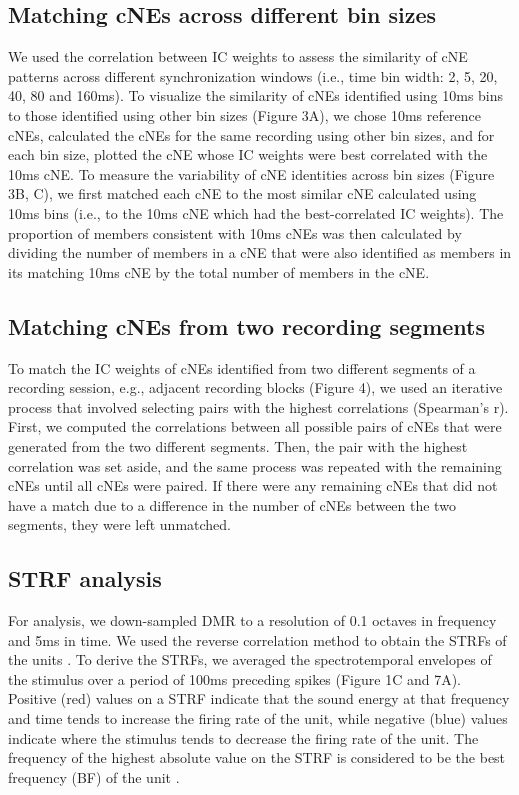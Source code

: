 \documentclass[11pt]{article}
\begin{document}
\subsection*{Matching cNEs across different bin sizes}
We used the correlation between IC weights to assess the similarity of cNE patterns across different synchronization windows (i.e., time bin width: 2, 5, 20, 40, 80 and 160ms). To visualize the similarity of cNEs identified using 10ms bins to those identified using other bin sizes (Figure 3A), we chose 10ms reference cNEs, calculated the cNEs for the same recording using other bin sizes, and for each bin size, plotted the cNE whose IC weights were best correlated with the 10ms cNE. To measure the variability of cNE identities across bin sizes (Figure 3B, C), we first matched each cNE to the most similar cNE calculated using 10ms bins (i.e., to the 10ms cNE which had the best-correlated IC weights). The proportion of members consistent with 10ms cNEs was then calculated by dividing the number of members in a cNE that were also identified as members in its matching 10ms cNE by the total number of members in the cNE.

\subsection*{Matching cNEs from two recording segments}
To match the IC weights of cNEs identified from two different segments of a recording session, e.g., adjacent recording blocks (Figure 4), we used an iterative process that involved selecting pairs with the highest correlations (Spearman's r). First, we computed the correlations between all possible pairs of cNEs that were generated from the two different segments. Then, the pair with the highest correlation was set aside, and the same process was repeated with the remaining cNEs until all cNEs were paired. If there were any remaining cNEs that did not have a match due to a difference in the number of cNEs between the two segments, they were left unmatched.

\subsection*{STRF analysis}
For analysis, we down-sampled DMR to a resolution of 0.1 octaves in frequency and 5ms in time. We used the reverse correlation method to obtain the STRFs of the units \citep{Theunissen2000, Escabi2002}. To derive the STRFs, we averaged the spectrotemporal envelopes of the stimulus over a period of 100ms preceding spikes (Figure 1C and 7A). Positive (red) values on a STRF indicate that the sound energy at that frequency and time tends to increase the firing rate of the unit, while negative (blue) values indicate where the stimulus tends to decrease the firing rate of the unit. The frequency of the highest absolute value on the STRF is considered to be the best frequency (BF) of the unit \citep{Miller2002}.
\end{document}
